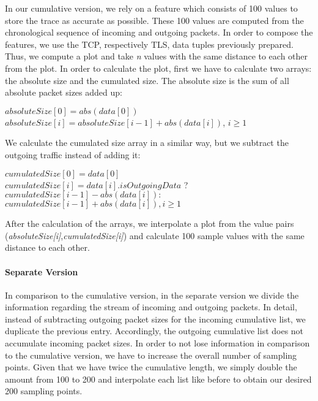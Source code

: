 In our cumulative version, we rely on a feature which consists of 100 values to store the trace as accurate as possible. These 100 values are computed from the chronological sequence of incoming and outgoing packets. In order to compose the features, we use the \ac{TCP}, respectively \ac{TLS}, data tuples previously prepared. Thus, we compute a plot and take \emph{n} values with the same distance to each other from the plot. In order to calculate the plot, first we have to calculate two arrays: the absolute size and the cumulated size. The absolute size is the sum of all absolute packet sizes added up:
\begin{center}
\hspace{-60mm}$absoluteSize[0] = abs(data[0])$\\
\hspace{-10mm}$absoluteSize[i] = absoluteSize[i - 1] + abs(data[i])$, $i \geq 1$
\end{center}
We calculate the cumulated size array in a similar way, but we subtract the outgoing traffic instead of adding it:
\begin{center}
\hspace{-90mm}$cumulatedSize[0] = data[0]$\\
$cumulatedSize[i] = data[i].isOutgoingData$ ? $cumulatedSize[i - 1] - abs(data[i]) :$\\
\hspace{-50mm}$cumulatedSize[i - 1] + abs(data[i]), i \geq 1$
\end{center}
After the calculation of the arrays, we interpolate a plot from the value pairs (\emph{absoluteSize[i]},\emph{cumulatedSize[i]}) and calculate 100 sample values with the same distance to each other. 

\paragraph{Separate Version}
\label{par:separate_version}

In comparison to the cumulative version, in the separate version we divide the information regarding the stream of incoming and outgoing packets. In detail, instead of subtracting outgoing packet sizes for the incoming cumulative list, we duplicate the previous entry. Accordingly, the outgoing cumulative list does not accumulate incoming packet sizes. In order to not lose information in comparison to the cumulative version, we have to increase the overall number of sampling points. Given that we have twice the cumulative length, we simply double the amount from 100 to 200 and interpolate each list like before to obtain our desired 200 sampling points. 

